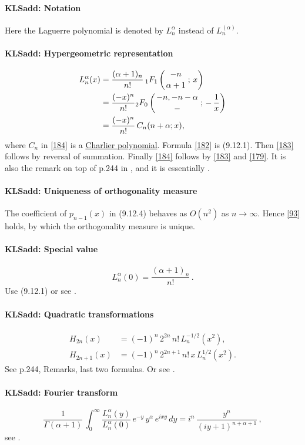 \documentclass[envcountchap,graybox]{svmono}
\newcommand{\hyp}[5]{\mbox{}_{#1}{F}_{#2}
\left(\genfrac{}{}{0pt}{}{#3}{#4}\,;\,#5\right)}
\renewcommand{\Gamma}{\varGamma}
\newcommand\al\alpha
\newcommand\Ga{\Gamma}
\newcommand\iy\infty
\newcommand{\hyp}[5]{\,\mbox{}_{#1}F_{#2}\!\left(
  \genfrac{}{}{0pt}{}{#3}{#4};#5\right)}
\begin{document}
\paragraph{\large\bf KLSadd: Notation}Here the Laguerre polynomial is denoted by $L_n^\al$ instead of
$L_n^{(\al)}$.
%
\paragraph{\large\bf KLSadd: Hypergeometric representation}\begin{align}
L_n^\al(x)&=
\frac{(\al+1)_n}{n!}\,\hyp11{-n}{\al+1}x
\label{182}\\
&=\frac{(-x)^n}{n!} \hyp20{-n,-n-\al}-{-\,\frac1x}
\label{183}\\
&=\frac{(-x)^n}{n!}\,C_n(n+\al;x),
\label{184}
\end{align}
where $C_n$ in \eqref{184} is a
\hyperref[sec9.14]{Charlier polynomial}.
Formula \eqref{182} is (9.12.1). Then \eqref{183} follows by reversal
of summation. Finally \eqref{184} follows by \eqref{183} and \eqref{179}.
It is also the remark on top of p.244 in , and it is essentially
.
%
\paragraph{\large\bf KLSadd: Uniqueness of orthogonality measure}The coefficient of $p_{n-1}(x)$ in (9.12.4) behaves as $O(n^2)$ as $n\to\iy$.
Hence \eqref{93} holds, by which the orthogonality measure is unique.
%
\paragraph{\large\bf KLSadd: Special value}\begin{equation}
L_n^{\al}(0)=\frac{(\al+1)_n}{n!}\,.
\label{53}
\end{equation}
Use (9.12.1) or see .
%
\paragraph{\large\bf KLSadd: Quadratic transformations}\begin{align}
H_{2n}(x)&=(-1)^n\,2^{2n}\,n!\,L_n^{-1/2}(x^2),
\label{54}\\
H_{2n+1}(x)&=(-1)^n\,2^{2n+1}\,n!\,x\,L_n^{1/2}(x^2).
\label{55}
\end{align}
See p.244, Remarks, last two formulas.
Or see .
%
\paragraph{\large\bf KLSadd: Fourier transform}\begin{equation}
\frac1{\Ga(\al+1)}\,\int_0^\iy \frac{L_n^\al(y)}{L_n^\al(0)}\,
e^{-y}\,y^\al\,e^{ixy}\,dy=
i^n\,\frac{y^n}{(iy+1)^{n+\al+1}}\,,
\label{14}
\end{equation}
see .
%
\end{document}
